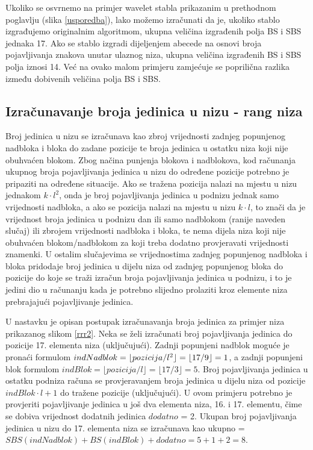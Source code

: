 Ukoliko se osvrnemo na primjer wavelet stabla prikazanim u prethodnom poglavlju (slika \ref{usporedba}), lako možemo izračunati da je, ukoliko stablo izgrađujemo originalnim algoritmom, ukupna veličina izgrađenih polja BS i SBS jednaka 17. Ako se stablo izgradi dijeljenjem abecede na osnovi broja pojavljivanja znakova unutar ulaznog niza, ukupna veličina izgrađenih BS i SBS polja iznosi 14. Već na ovako malom primjeru zamjećuje se poprilična razlika između dobivenih veličina polja BS i SBS.


\subsection{Izračunavanje broja jedinica u nizu - rang niza}
Broj jedinica u nizu se izračunava kao zbroj vrijednosti zadnjeg popunjenog nadbloka i bloka do zadane pozicije te broja jedinica u ostatku niza koji nije obuhvaćen blokom. Zbog načina punjenja blokova i nadblokova, kod računanja ukupnog broja pojavljivanja jedinica u nizu do određene pozicije potrebno je pripaziti na određene situacije. Ako se tražena pozicija nalazi na mjestu u nizu jednakom $k\cdot l^2$, onda je broj pojavljivanja jedinica u podnizu jednak samo vrijednosti nadbloka, a ako se pozicija nalazi na mjestu u nizu $k\cdot l$, to znači da je vrijednost broja jedinica u podnizu dan ili samo nadblokom (ranije naveden slučaj) ili zbrojem vrijednosti nadbloka i bloka, te nema dijela niza koji nije obuhvaćen blokom/nadblokom za koji treba dodatno provjeravati vrijednosti znamenki. U ostalim slučajevima se vrijednostima zadnjeg popunjenog nadbloka i bloka pridodaje broj jedinica u dijelu niza od zadnjeg popunjenog bloka do pozicije do koje se traži izračun broja pojavljivanja jedinica u podnizu, i to je jedini dio u računanju kada je potrebno slijedno prolaziti kroz elemente niza prebrajajući pojavljivanje jedinica.

U nastavku je opisan postupak izračunavanja broja jedinica za primjer niza prikazanog slikom \ref{rrr2}. Neka se želi izračunati broj pojavljivanja jedinica do pozicije 17. elementa niza (uključujući). Zadnji popunjeni nadblok moguće je pronaći formulom $indNadblok = \linebreak \lfloor pozicija/l^2 \rfloor = \lfloor 17/9 \rfloor = 1$, a zadnji popunjeni blok formulom $indBlok = \lfloor pozicija/l \rfloor = \lfloor 17/3 \rfloor = 5$. Broj pojavljivanja jedinica u ostatku podniza računa se provjeravanjem broja jedinica u dijelu niza od pozicije $indBlok\cdot l+1$ do tražene pozicije (uključujući). U ovom primjeru potrebno je provjeriti pojavljivanje jedinica u još dva elementa niza, 16. i 17. elementu, čime se dobiva vrijednost dodatnih jedinica $dodatno$ = 2. Ukupan broj pojavljivanja jedinica u nizu do 17. elementa niza se izračunava kao ukupno  = $SBS(indNadblok) + BS(indBlok) + dodatno = 5 + 1 + 2 = 8$.

